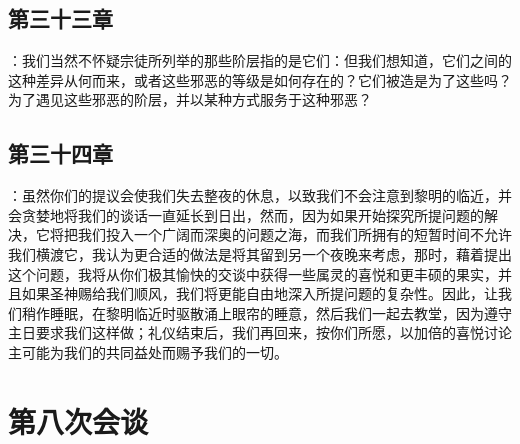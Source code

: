 
\subsection{第三十三章}

\par

：我们当然不怀疑宗徒所列举的那些阶层指的是它们：但我们想知道，它们之间的这种差异从何而来，或者这些邪恶的等级是如何存在的？它们被造是为了这些吗？为了遇见这些邪恶的阶层，并以某种方式服务于这种邪恶？\par


\subsection{第三十四章}

\par

：虽然你们的提议会使我们失去整夜的休息，以致我们不会注意到黎明的临近，并会贪婪地将我们的谈话一直延长到日出，然而，因为如果开始探究所提问题的解决，它将把我们投入一个广阔而深奥的问题之海，而我们所拥有的短暂时间不允许我们横渡它，我认为更合适的做法是将其留到另一个夜晚来考虑，那时，藉着提出这个问题，我将从你们极其愉快的交谈中获得一些属灵的喜悦和更丰硕的果实，并且如果圣神赐给我们顺风，我们将更能自由地深入所提问题的复杂性。因此，让我们稍作睡眠，在黎明临近时驱散涌上眼帘的睡意，然后我们一起去教堂，因为遵守主日要求我们这样做；礼仪结束后，我们再回来，按你们所愿，以加倍的喜悦讨论主可能为我们的共同益处而赐予我们的一切。\par



\section{第八次会谈}

